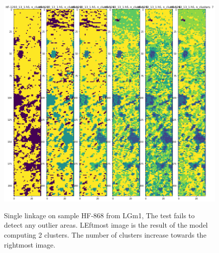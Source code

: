 \documentclass[a4paper, 12pt, oneside]{book}
\begin{document}
\begin{appendices}
\begin{figure}[H]
    \centering
{\includegraphics[width=15cm]{images/KMeans_full/LGm-1/HF-1293_13_1.h5_1.png} }
\caption{Single linkage on sample HF-868 from LGm1, The test fails to detect any outlier areas. LEftmost image is the result of the model computing 2 clusters. The number of clusters increase towards the rightmost image.\label{fig:SL_HF868}}%

\end{figure}


\end{appendices}
\end{document}

